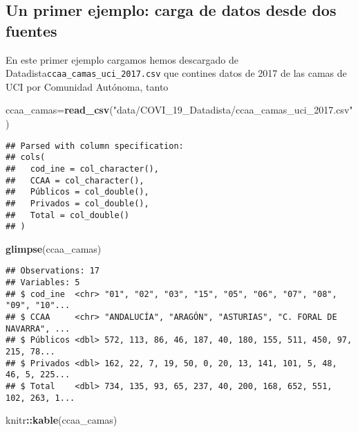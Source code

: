 \documentclass[
]{article}
\newenvironment{Shaded}{\begin{snugshade}}{\end{snugshade}}
\newcommand{\KeywordTok}[1]{\textcolor[rgb]{0.13,0.29,0.53}{\textbf{#1}}}
\newcommand{\NormalTok}[1]{#1}
\newcommand{\OperatorTok}[1]{\textcolor[rgb]{0.81,0.36,0.00}{\textbf{#1}}}
\newcommand{\StringTok}[1]{\textcolor[rgb]{0.31,0.60,0.02}{#1}}
\begin{document}
\hypertarget{un-primer-ejemplo-carga-de-datos-desde-dos-fuentes}{%
\subsection{Un primer ejemplo: carga de datos desde dos
fuentes}\label{un-primer-ejemplo-carga-de-datos-desde-dos-fuentes}}

En este primer ejemplo cargamos hemos descargado de
Datadista\texttt{ccaa\_camas\_uci\_2017.csv} que contines datos de 2017
de las camas de UCI por Comunidad Autónoma, tanto

\begin{Shaded}
\begin{Highlighting}[]
\NormalTok{ccaa_camas=}\KeywordTok{read_csv}\NormalTok{(}\StringTok{"data/COVI_19_Datadista/ccaa_camas_uci_2017.csv"}\NormalTok{)}
\end{Highlighting}
\end{Shaded}

\begin{verbatim}
## Parsed with column specification:
## cols(
##   cod_ine = col_character(),
##   CCAA = col_character(),
##   Públicos = col_double(),
##   Privados = col_double(),
##   Total = col_double()
## )
\end{verbatim}

\begin{Shaded}
\begin{Highlighting}[]
\KeywordTok{glimpse}\NormalTok{(ccaa_camas)}
\end{Highlighting}
\end{Shaded}

\begin{verbatim}
## Observations: 17
## Variables: 5
## $ cod_ine  <chr> "01", "02", "03", "15", "05", "06", "07", "08", "09", "10"...
## $ CCAA     <chr> "ANDALUCÍA", "ARAGÓN", "ASTURIAS", "C. FORAL DE NAVARRA", ...
## $ Públicos <dbl> 572, 113, 86, 46, 187, 40, 180, 155, 511, 450, 97, 215, 78...
## $ Privados <dbl> 162, 22, 7, 19, 50, 0, 20, 13, 141, 101, 5, 48, 46, 5, 225...
## $ Total    <dbl> 734, 135, 93, 65, 237, 40, 200, 168, 652, 551, 102, 263, 1...
\end{verbatim}

\begin{Shaded}
\begin{Highlighting}[]
\NormalTok{knitr}\OperatorTok{::}\KeywordTok{kable}\NormalTok{(ccaa_camas)}
\end{Highlighting}
\end{Shaded}
\end{document}
